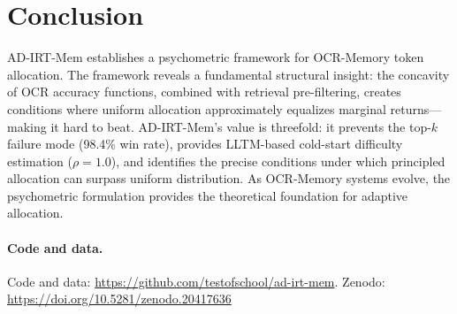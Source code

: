 \documentclass{article}
\begin{document}
\section{Conclusion}

AD-IRT-Mem establishes a psychometric framework for OCR-Memory token allocation. The framework reveals a fundamental structural insight: the concavity of OCR accuracy functions, combined with retrieval pre-filtering, creates conditions where uniform allocation approximately equalizes marginal returns---making it hard to beat. AD-IRT-Mem's value is threefold: it prevents the top-$k$ failure mode (98.4\% win rate), provides LLTM-based cold-start difficulty estimation ($\rho = 1.0$), and identifies the precise conditions under which principled allocation can surpass uniform distribution. As OCR-Memory systems evolve, the psychometric formulation provides the theoretical foundation for adaptive allocation.

\paragraph{Code and data.} Code and data: \url{https://github.com/testofschool/ad-irt-mem}. Zenodo: \url{https://doi.org/10.5281/zenodo.20417636}
\end{document}
